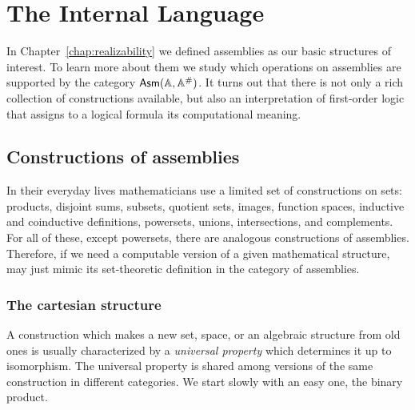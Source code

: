 \chapter{The Internal Language}
\label{chap:internal-language}

In Chapter~\ref{chap:realizability} we defined assemblies as our basic
structures of interest. To learn more about them we study which
operations on assemblies are supported by the category $\mathsf{Asm}(\mathbb{A},\mathbb{A}^{\#})$. It
turns out that there is not only a rich collection of constructions
available, but also an interpretation of first-order logic that
assigns to a logical formula its computational meaning.

\section{Constructions of assemblies}
\label{sec:constructions}

In their everyday lives mathematicians use a limited set of
constructions on sets: products, disjoint sums, subsets, quotient
sets, images, function spaces, inductive and coinductive definitions,
powersets, unions, intersections, and complements. For all of these,
except powersets, there are analogous constructions of assemblies.
Therefore, if we need a computable version of a given mathematical
structure, may just mimic its set-theoretic definition in the
category of assemblies.

\subsection{The cartesian structure}
\label{sec:cartesian-structure}

A construction which makes a new set, space, or an algebraic structure
from old ones is usually characterized by a \emph{universal property}
which determines it up to isomorphism. The universal property is
shared among versions of the same construction in different
categories. We start slowly with an easy one, the binary product.

